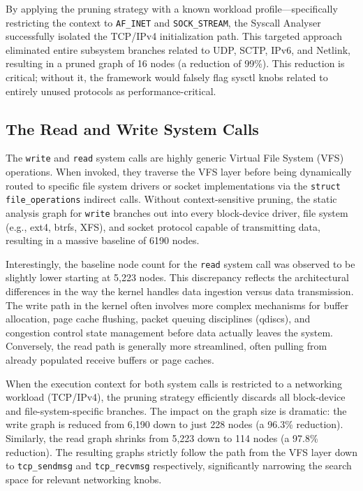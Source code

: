 By applying the pruning strategy with a known workload profile—specifically restricting the context to \texttt{AF\_INET} and \texttt{SOCK\_STREAM}, the Syscall Analyser successfully isolated the TCP/IPv4 initialization path.
This targeted approach eliminated entire subsystem branches related to UDP, SCTP, IPv6, and Netlink, resulting in a pruned graph of 16 nodes (a reduction of 99\%).
This reduction is critical; without it, the framework would falsely flag sysctl knobs related to entirely unused protocols as performance-critical.

\subsection{The Read and Write System Calls}

The \texttt{write} and \texttt{read} system calls are highly generic Virtual File System (VFS) operations.
When invoked, they traverse the VFS layer before being dynamically routed to specific file system drivers or socket implementations via the \texttt{struct file\_operations} indirect calls. Without context-sensitive pruning, the static analysis graph for \texttt{write} branches out into every block-device driver, file system (e.g., ext4, btrfs, XFS), and socket protocol capable of transmitting data, resulting in a massive baseline of 6190 nodes.

Interestingly, the baseline node count for the \texttt{read} system call was observed to be slightly lower starting at 5,223 nodes.
This discrepancy reflects the architectural differences in the way the kernel handles data ingestion versus data transmission.
The write path in the kernel often involves more complex mechanisms for buffer allocation, page cache flushing, packet queuing disciplines (qdiscs), and congestion control state management before data actually leaves the system.
Conversely, the read path is generally more streamlined, often pulling from already populated receive buffers or page caches.

When the execution context for both system calls is restricted to a networking workload (TCP/IPv4), the pruning strategy efficiently discards all block-device and file-system-specific branches.
The impact on the graph size is dramatic: the write graph is reduced from 6,190 down to just 228 nodes (a 96.3\% reduction). Similarly, the read graph shrinks from 5,223 down to 114 nodes (a 97.8\% reduction).
The resulting graphs strictly follow the path from the VFS layer down to \texttt{tcp\_sendmsg} and \texttt{tcp\_recvmsg} respectively, significantly narrowing the search space for relevant networking knobs.

